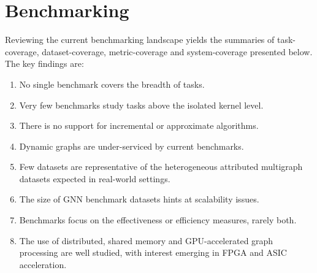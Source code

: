 \section{Benchmarking \gai}
\label{section:32-related-benchmarking-gai}



Reviewing the current \gai benchmarking landscape yields the summaries of task-coverage, dataset-coverage, metric-coverage and system-coverage presented below. 
The key findings are:
\begin{enumerate}
    \item No single benchmark covers the breadth of \gai tasks. 
    \item Very few benchmarks study \gai tasks above the isolated kernel level. 
    \item There is no support for incremental or approximate \gai algorithms. 
    \item Dynamic graphs are under-serviced by current benchmarks.
    \item Few datasets are representative of the heterogeneous attributed multigraph datasets expected in real-world settings.
    \item The size of GNN benchmark datasets hints at scalability issues.
    \item Benchmarks focus on the effectiveness or efficiency measures, rarely both.
    \item The use of distributed, shared memory and GPU-accelerated graph processing are well studied, with interest emerging in FPGA and ASIC acceleration.
\end{enumerate}


